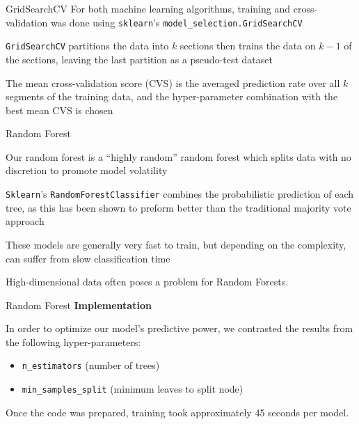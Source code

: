 \documentclass[titlepage,leqno]{beamer}%
\begin{document}
\begin{frame}[fragile]{GridSearchCV}
\begingroup
\small
For both machine learning algorithms, training and cross-validation was done using \verb+sklearn+'s \verb+model_selection.GridSearchCV+

\vspace{3.75mm}

\verb+GridSearchCV+ partitions the data into $k$ sections then trains the data on $k-1$ of the sections, leaving the last partition as a pseudo-test dataset

\vspace{3.75mm}

The mean cross-validation score (CVS) is the averaged prediction rate over all $k$ segments of the training data, and the hyper-parameter combination with the best mean CVS is chosen

\vspace{3.7mm}

\endgroup
\end{frame}
\begin{frame}[fragile]{Random Forest}

Our random forest is a ``highly random'' random forest which splits data with no discretion to promote model volatility

\vspace{3.75mm}

\verb+Sklearn+'s \verb+RandomForestClassifier+ combines the probabilistic prediction of each tree, as this has been shown to preform better than the traditional majority vote approach

\vspace{3.7mm}

These models are generally very fast to train, but depending on the complexity, can suffer from slow classification time

\vspace{3.7mm}

High-dimensional data often poses a problem for Random Forests.

\end{frame}
\begin{frame}[fragile]{Random Forest}
\small
\textbf{Implementation}

\medskip

In order to optimize our model's predictive power, we contrasted the results from the following hyper-parameters:
\begin{itemize}
    \item \verb+n_estimators+ (number of trees)
    \item \verb+min_samples_split+ (minimum leaves to split node) %
\end{itemize}
\vspace{3.75mm}

Once the code was prepared, training took approximately 45 seconds per model.

\end{frame}
\end{document}
